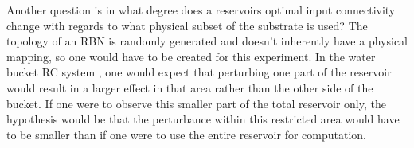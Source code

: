 Another question is in what degree does a reservoirs optimal input connectivity change with regards to what physical subset of the substrate is used?
The topology of an RBN is randomly generated and doesn't inherently have a physical mapping,
so one would have to be created for this experiment.
In the water bucket RC system \cite{fernando2003pattern},
one would expect that perturbing one part of the reservoir would result in a larger effect in that area rather than the other side of the bucket.
If one were to observe this smaller part of the total reservoir only,
the hypothesis would be that the perturbance within this restricted area would have to be smaller than if one were to use the entire reservoir for computation.
